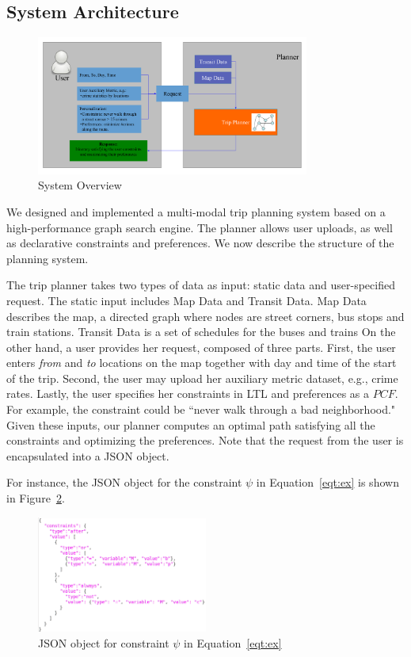 \documentclass[letterpaper]{article}
\newcommand{\tit}[1]{\textit{#1}}
\newcommand{\PCF}{\mathit{PCF}}
\newcommand{\figref}[1]{Figure~\ref{fig:#1}}
\newcommand{\eqtref}[1]{Equation~\ref{eqt:#1}}
\begin{document}
\subsection{System Architecture}
\begin{figure}[!ht]
  \centering
    \includegraphics[width=0.8\textwidth]{figs/system.pdf}
  \caption{System Overview\label{fig:system}}
\end{figure}
We designed and implemented a multi-modal trip planning
system based on a high-performance graph search engine.
The planner allows user uploads, as well as declarative
constraints and preferences.
We now describe the structure of the planning system.

The trip planner takes two types of data as input:
static data and user-specified request.
The static input includes Map Data and Transit
Data.
Map Data describes the map, a directed graph where 
nodes are street corners, bus stops and train stations.
Transit Data is a set of schedules for the buses and trains
On the other hand, a user provides her request, composed of 
three parts.
First, the user enters \tit{from} and \tit{to} locations 
on the map together with day and time of the start of the trip.  
Second, the user may upload her auxiliary metric dataset, e.g., crime rates.  
Lastly, the user specifies her constraints in LTL and preferences as a $\PCF$.
For example, the constraint 
could be ``never walk through a bad neighborhood."  Given these 
inputs, our planner computes an optimal path satisfying 
all the constraints and optimizing the preferences.
Note that the request from the user is encapsulated into
a JSON object.

For instance, the JSON object for the constraint $\psi$ in \eqtref{ex}
is shown in \figref{exJSON}.
\begin{figure}[!ht]
  \centering
    \includegraphics[width=0.5\textwidth]{figs/exampleJSON.png}
  \caption{JSON object for constraint $\psi$ in \eqtref{ex}\label{fig:exJSON}}
\end{figure}
\end{document}
